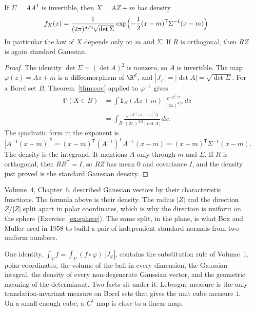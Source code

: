 \begin{theorem}\label{thm:gaussdensity}
If $\Sigma=AA^{\mathsf T}$ is invertible, then $X=AZ+m$ has density
\[f_X(x)=\frac1{(2\pi)^{d/2}\sqrt{\det\Sigma}}\exp\Bigl(-\frac12(x-m)^{\mathsf T}\Sigma^{-1}(x-m)\Bigr).\]
In particular the law of $X$ depends only on $m$ and $\Sigma$. If $R$ is orthogonal, then $RZ$ is again standard Gaussian.
\end{theorem}
\begin{proof}
The identity $\det\Sigma=(\det A)^2$ is nonzero, so $A$ is invertible. The map $\varphi(z)=Az+m$ is a diffeomorphism of $\R^d$, and $|J_\varphi|=|\det A|=\sqrt{\det\Sigma}$. For a Borel set $B$, Theorem~\ref{thm:cov} applied to $\varphi^{-1}$ gives
\begin{align*}
\mathbb P(X\in B)
&=\int\mathbf 1_B(Az+m)\,\frac{e^{-|z|^2/2}}{(2\pi)^{d/2}}\,dz\\
&=\int_B\frac{e^{-|A^{-1}(x-m)|^2/2}}{(2\pi)^{d/2}\,|\det A|}\,dx.
\end{align*}
The quadratic form in the exponent is
\[
|A^{-1}(x-m)|^2=(x-m)^{\mathsf T}(A^{-1})^{\mathsf T}A^{-1}(x-m)=(x-m)^{\mathsf T}\Sigma^{-1}(x-m).
\]
The density is the integrand. It mentions $A$ only through $m$ and $\Sigma$. If $R$ is orthogonal, then $RR^{\mathsf T}=I$, so $RZ$ has mean $0$ and covariance $I$, and the density just proved is the standard Gaussian density.
\end{proof}

Volume~4, Chapter~6, described Gaussian vectors by their characteristic functions. The formula above is their density. The radius $|Z|$ and the direction $Z/|Z|$ split apart in polar coordinates, which is why the direction is uniform on the sphere (Exercise~\ref{ex:sphere}). The same split, in the plane, is what Box and Muller used in 1958 to build a pair of independent standard normals from two uniform numbers.

\begin{beauty}
One identity, $\int_V f=\int_U(f\circ\varphi)\,|J_\varphi|$, contains the substitution rule of Volume~1, polar coordinates, the volume of the ball in every dimension, the Gaussian integral, the density of every non-degenerate Gaussian vector, and the geometric meaning of the determinant. Two facts sit under it. Lebesgue measure is the only translation-invariant measure on Borel sets that gives the unit cube measure $1$. On a small enough cube, a $C^1$ map is close to a linear map.
\end{beauty}


